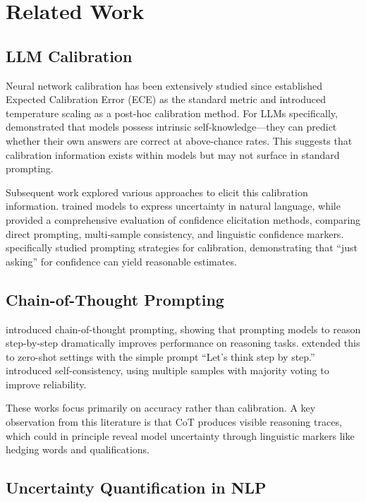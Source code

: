 \section{Related Work}

\subsection{LLM Calibration}

Neural network calibration has been extensively studied since \citet{guo2017calibration} established Expected Calibration Error (ECE) as the standard metric and introduced temperature scaling as a post-hoc calibration method. For LLMs specifically, \citet{kadavath2022language} demonstrated that models possess intrinsic self-knowledge---they can predict whether their own answers are correct at above-chance rates. This suggests that calibration information exists within models but may not surface in standard prompting.

Subsequent work explored various approaches to elicit this calibration information. \citet{lin2022teaching} trained models to express uncertainty in natural language, while \citet{xiong2023can} provided a comprehensive evaluation of confidence elicitation methods, comparing direct prompting, multi-sample consistency, and linguistic confidence markers. \citet{tian2023just} specifically studied prompting strategies for calibration, demonstrating that ``just asking'' for confidence can yield reasonable estimates.

\subsection{Chain-of-Thought Prompting}

\citet{wei2022cot} introduced chain-of-thought prompting, showing that prompting models to reason step-by-step dramatically improves performance on reasoning tasks. \citet{kojima2022zeroshot} extended this to zero-shot settings with the simple prompt ``Let's think step by step.'' \citet{wang2023selfconsistency} introduced self-consistency, using multiple samples with majority voting to improve reliability.

These works focus primarily on accuracy rather than calibration. A key observation from this literature is that CoT produces visible reasoning traces, which could in principle reveal model uncertainty through linguistic markers like hedging words and qualifications.

\subsection{Uncertainty Quantification in NLP}

